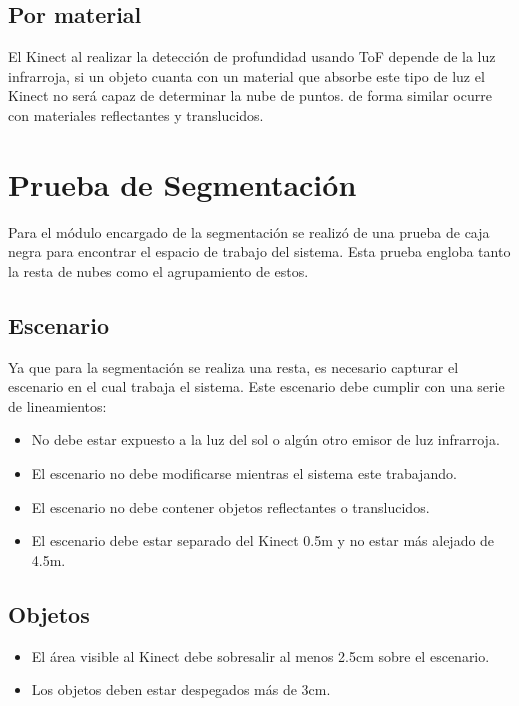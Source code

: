 	
	\subsection{Por material}
	El Kinect al realizar la detección de profundidad usando ToF depende de la luz infrarroja, si un objeto cuanta con un material que absorbe este tipo de luz el Kinect no será capaz de determinar la nube de puntos. de forma similar ocurre con materiales reflectantes y translucidos.\\
	
\section{Prueba de Segmentación}

	Para el módulo encargado de la segmentación se realizó de una prueba de caja negra para encontrar el espacio de trabajo del sistema. Esta prueba engloba tanto la resta de nubes como el agrupamiento de estos.\\
	\subsection{Escenario}
	Ya que para la segmentación se realiza una resta, es necesario capturar el escenario en el cual trabaja el sistema. Este escenario debe cumplir con una serie de lineamientos:
	\begin{itemize}
		\item No debe estar expuesto a la luz del sol o algún otro emisor de luz infrarroja.
		\item El escenario no debe modificarse mientras el sistema este trabajando.
		\item El escenario no debe contener objetos reflectantes o translucidos.
		\item El escenario debe estar separado del Kinect 0.5m y no estar más alejado de 4.5m.
	\end{itemize}

	\subsection{Objetos}
	\begin{itemize}
		\item El área visible al Kinect debe sobresalir al menos 2.5cm sobre el escenario.
		\item Los objetos deben estar despegados más de 3cm.
	\end{itemize}
	 
